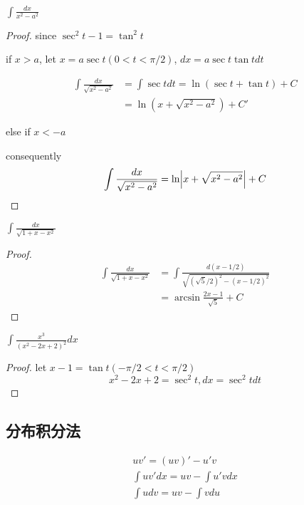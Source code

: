 \documentclass[11pt]{article}
\begin{document}
\begin{proposition}[]
\(\int\frac{dx}{x^2-a^2}\)
\end{proposition}

\begin{proof}
since \(\sec^2t-1=\tan^2t\)

if \(x>a\), let \(x=a\sec t(0<t<\pi/2)\), \(dx=a\sec t\tan tdt\)

\begin{align*}
\int\frac{dx}{\sqrt{x^2-a^2}}&=\int\sec tdt=\ln(\sec t+\tan t)+C\\
&=\ln(x+\sqrt{x^2-a^2})+C'
\end{align*}

else if \(x<-a\)

consequently
\begin{equation*}
\int\frac{dx}{\sqrt{x^2-a^2}}=\ln\abs{x+\sqrt{x^2-a^2}}+C
\end{equation*}
\end{proof}

\begin{proposition}[]
\(\int\frac{dx}{\sqrt{1+x-x^2}}\)
\end{proposition}

\begin{proof}
    \begin{align*}
\int\frac{dx}{\sqrt{1+x-x^2}}&=\int\frac{d(x-1/2)}{\sqrt{(\sqrt{5}/2)^2-(x-1/2)^2}}\\
&=\arcsin\frac{2x-1}{\sqrt{5}}+C
\end{align*}
\end{proof}


\begin{proposition}[]
\(\int\frac{x^3}{(x^2-2x+2)^2}dx\)
\end{proposition}

\begin{proof}
let \(x-1=\tan t(-\pi/2<t<\pi/2)\)
\begin{equation*}
x^2-2x+2=\sec^2t, dx=\sec^2tdt
\end{equation*}
\end{proof}
\subsection{分布积分法}
\label{sec:orgf81cc4e}
\begin{gather*}
uv'=(uv)'-u'v\\
\int uv'dx=uv-\int u'vdx\\
\int udv=uv-\int vdu
\end{gather*}
\end{document}
